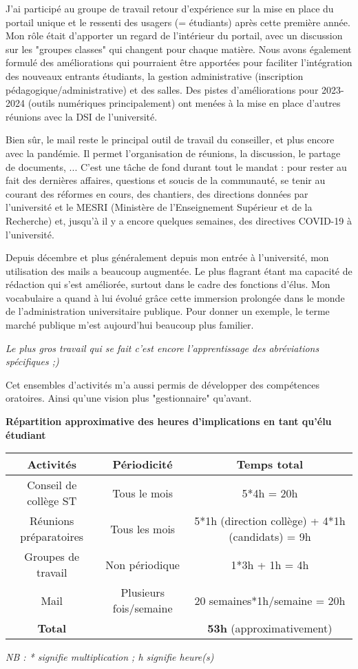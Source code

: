 \documentclass{article}
\begin{document}
J'ai participé au groupe de travail retour d'expérience sur la mise en place du portail unique et le ressenti des usagers (= étudiants) après cette première année. Mon rôle était d'apporter un regard de l'intérieur du portail, avec un discussion sur les "groupes classes" qui changent pour chaque matière. Nous avons également formulé des améliorations qui pourraient être apportées pour faciliter l'intégration des nouveaux entrants étudiants, la gestion administrative (inscription pédagogique/administrative) et des salles. Des pistes d'améliorations pour 2023-2024 (outils numériques principalement) ont menées à la mise en place d'autres réunions avec la DSI de l'université.

Bien sûr, le mail reste le principal outil de travail du conseiller, et plus encore avec la pandémie. Il permet l'organisation de réunions, la discussion, le partage de documents, ... C'est une tâche de fond durant tout le mandat : pour rester au fait des dernières affaires, questions et soucis de la communauté, se tenir au courant des réformes en cours, des chantiers, des directions données par l'université et le MESRI (Ministère de l'Enseignement Supérieur et de la Recherche) et, jusqu'à il y a encore quelques semaines, des directives COVID-19 à l'université.

Depuis décembre et plus généralement depuis mon entrée à l'université, mon utilisation des mails a beaucoup augmentée. Le plus flagrant étant ma capacité de rédaction qui s'est améliorée, surtout dans le cadre des fonctions d'élus. Mon vocabulaire a quand à lui évolué grâce cette immersion prolongée dans le monde de l'administration universitaire publique. Pour donner un exemple, le terme marché publique m'est aujourd'hui beaucoup plus familier. 

\textit{Le plus gros travail qui se fait c'est encore l'apprentissage des abréviations spécifiques ;)}

Cet ensembles d'activités m'a aussi permis de développer des compétences oratoires. Ainsi qu'une vision plus "gestionnaire" qu'avant. 

\begin{center}
\textbf{Répartition approximative des heures d'implications en tant qu'élu étudiant}
\vspace*{10pt}

\begin{tabular}{|c|c|c|}
\hline 
Activités & Périodicité & Temps total\\ 
\hline 
Conseil de collège ST & Tous le mois & 5*4h = 20h \\ 
\hline 
Réunions préparatoires & Tous les mois & 5*1h (direction collège) + 4*1h (candidats) = 9h\\ 
\hline 
Groupes de travail & Non périodique & 1*3h + 1h = 4h\\ 
\hline 
Mail & Plusieurs fois/semaine & 20 semaines*1h/semaine = 20h\\ 
\hline 
\textbf{Total} &  & \textbf{53h} (approximativement) \\ 
\hline 
\end{tabular} 
\end{center}
\textit{NB : * signifie multiplication ; h signifie heure(s)}
\end{document}
